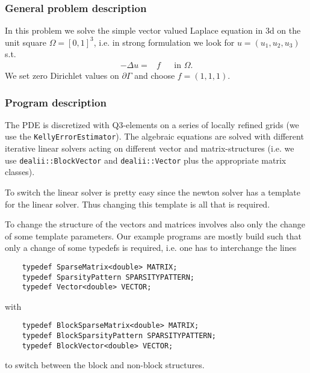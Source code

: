 \subsubsection{General problem description}
In this problem we solve the simple vector valued Laplace equation in 3d
on the unit square $\Omega=[0,1]^3$, i.e. in strong formulation we look for $u=(u_1, u_2, u_3)$ s.t.
\begin{align*}
-\Delta u =& f &&\text{in }\Omega.
\end{align*}
We set zero Dirichlet values on $\partial \Gamma$ and choose $f=(1,1,1)$.
\subsubsection{Program description}
The PDE is discretized with Q3-elements on a series of locally refined grids (we use the \texttt{KellyErrorEstimator}). The algebraic equations are solved with  different iterative linear solvers acting on different vector and matrix-structures (i.e. we use \texttt{dealii::BlockVector} and \texttt{dealii::Vector} plus the appropriate matrix classes). 

To switch the linear solver is pretty easy since the newton solver has a template for the linear solver. Thus changing this template is all that is required. 

To change the structure of the vectors and matrices involves also only the change of some template parameters. Our example programs are mostly build such that only a change of some typedefs is required, i.e. one has to interchange the lines
\begin{verbatim}
	typedef SparseMatrix<double> MATRIX;
	typedef SparsityPattern SPARSITYPATTERN;
	typedef Vector<double> VECTOR;
\end{verbatim}
with
\begin{verbatim}
	typedef BlockSparseMatrix<double> MATRIX;
	typedef BlockSparsityPattern SPARSITYPATTERN;
	typedef BlockVector<double> VECTOR;
\end{verbatim}
to switch between the block and non-block structures.

